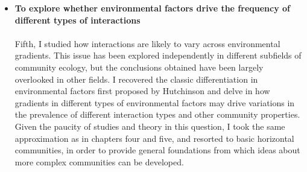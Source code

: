 \begin{itemize}
\item \textbf{To explore whether environmental factors drive the frequency of different types of interactions}\\ \\
Fifth, I studied how interactions are likely to vary across environmental gradients. This issue has been explored independently in different subfields of community ecology, but the conclusions obtained have been largely overlooked in other fields. I recovered the classic differentiation in environmental factors first proposed by Hutchinson and delve in how gradients in different types of environmental factors may drive variations in the prevalence of different interaction types and other community properties. Given the paucity of studies and theory in this question, I took the same approximation as in chapters four and five, and resorted to basic horizontal communities, in order to provide general foundations from which ideas about more complex communities can be developed.

\end{itemize}
